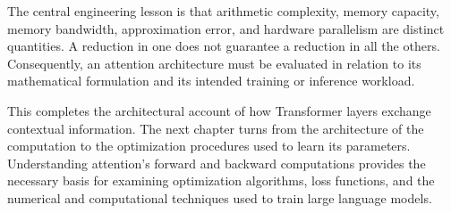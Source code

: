 The central engineering lesson is that arithmetic complexity, memory
capacity, memory bandwidth, approximation error, and hardware
parallelism are distinct quantities. A reduction in one does not
guarantee a reduction in all the others. Consequently, an attention
architecture must be evaluated in relation to its mathematical
formulation and its intended training or inference workload.

This completes the architectural account of how Transformer layers
exchange contextual information. The next chapter turns from the
architecture of the computation to the optimization procedures used
to learn its parameters. Understanding attention's forward and
backward computations provides the necessary basis for examining
optimization algorithms, loss functions, and the numerical and
computational techniques used to train large language models.
